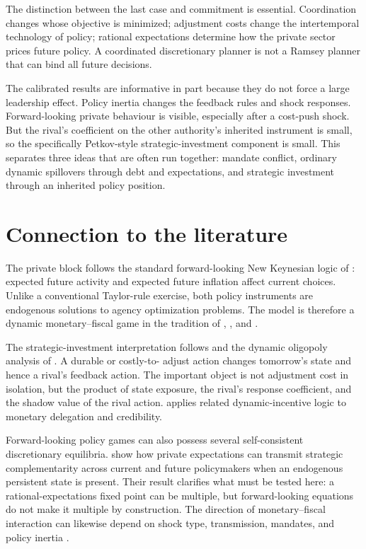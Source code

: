 \documentclass[11pt]{article}
\begin{document}
The distinction between the last case and commitment is essential.
Coordination changes whose objective is minimized; adjustment costs change the
intertemporal technology of policy; rational expectations determine how the
private sector prices future policy. A coordinated discretionary planner is
not a Ramsey planner that can bind all future decisions.

The calibrated results are informative in part because they do not force a
large leadership effect. Policy inertia changes the feedback rules and shock
responses. Forward-looking private behaviour is visible, especially after a
cost-push shock. But the rival's coefficient on the other authority's inherited
instrument is small, so the specifically Petkov-style strategic-investment
component is small. This separates three ideas that are often run together:
mandate conflict, ordinary dynamic spillovers through debt and expectations,
and strategic investment through an inherited policy position.

\section{Connection to the literature}

The private block follows the standard forward-looking New Keynesian logic of
\citet{ClaridaGaliGertler1999}: expected future activity and expected future
inflation affect current choices. Unlike a conventional Taylor-rule exercise,
both policy instruments are endogenous solutions to agency optimization
problems. The model is therefore a dynamic monetary--fiscal game in the
tradition of \citet{OudizSachs1984}, \citet{Tabellini1986}, and
\citet{BeetsmaBovenberg1997}.

The strategic-investment interpretation follows \citet{Petkov2004} and the
dynamic oligopoly analysis of \citet{JunVives2004}. A durable or costly-to-
adjust action changes tomorrow's state and hence a rival's feedback action.
The important object is not adjustment cost in isolation, but the product of
state exposure, the rival's response coefficient, and the shadow value of the
rival action. \citet{CouryPetkov2010} applies related dynamic-incentive logic
to monetary delegation and credibility.

Forward-looking policy games can also possess several self-consistent
discretionary equilibria. \citet{KirsanovaYates2025} show how private
expectations can transmit strategic complementarity across current and future
policymakers when an endogenous persistent state is present. Their result
clarifies what must be tested here: a rational-expectations fixed point can be
multiple, but forward-looking equations do not make it multiple by
construction. The direction of monetary--fiscal interaction can likewise
depend on shock type, transmission, mandates, and policy inertia
\citep{MuscatelliEtAl2004}.
\end{document}
